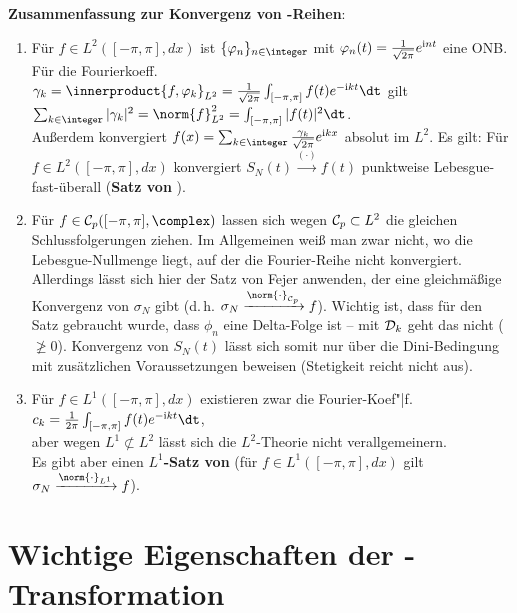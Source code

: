 \linie

\textbf{Zusammenfassung zur Konvergenz von -Reihen}:
\begin{enumerate}
    \item
    Für $f \in L^2([-\pi, \pi], dx)$ ist $\{\varphi_n\}_{n \in \integer}$
    mit $\varphi_n(t) = \frac{1}{\sqrt{2\pi}} e^{\mathrm{i} nt}$ eine ONB.
    Für die Fourierkoeff. $\gamma_k = \innerproduct{f, \varphi_k}_{L^2} =
    \frac{1}{\sqrt{2\pi}} \int_{[-\pi, \pi]} f(t) e^{-\i kt}\dt$ gilt
    $\sum_{k \in \integer} |\gamma_k|^2 = \norm{f}_{L^2}^2 =
    \int_{[-\pi, \pi]} |f(t)|^2 \dt$.\\
    Außerdem konvergiert $f(x) = \sum_{k \in \integer}
    \frac{\gamma_k}{\sqrt{2\pi}} e^{\i kx}$ absolut im $L^2$.
    Es gilt:
    Für $f \in L^2([-\pi, \pi], dx)$ konvergiert
    $S_N(t) \xrightarrow{(\cdot)} f(t)$ punktweise Lebesgue-fast-überall
    (\textbf{Satz von }).

    \item
    Für $f \in \C_p([-\pi, \pi], \complex)$ lassen sich wegen
    $\mathcal{C}_p \subset L^2$ die gleichen Schlussfolgerungen ziehen.
    Im Allgemeinen weiß man zwar nicht, wo die Lebesgue-Nullmenge liegt,
    auf der die Fourier-Reihe nicht konvergiert.
    Allerdings lässt sich hier der Satz von Fejer anwenden, der eine
    gleichmäßige Konvergenz von $\sigma_N$ gibt
    (d.\,h. $\sigma_N \xrightarrow{\norm{\cdot}_{\C_p}} f$).
    Wichtig ist, dass für den Satz gebraucht wurde, dass $\phi_n$ eine
    Delta-Folge ist -- mit $\mathcal{D}_k$ geht das nicht ($\not\ge 0$).
    Konvergenz von $S_N(t)$ lässt sich somit nur über die Dini-Bedingung mit
    zusätzlichen Voraussetzungen beweisen (Stetigkeit reicht nicht aus).

    \item
    Für $f \in L^1([-\pi, \pi], dx)$ existieren zwar die
    Fourier-Koef"|f.
    $c_k = \frac{1}{2\pi} \int_{[-\pi, \pi]} f(t) e^{-\i kt} \dt$,\\
    aber wegen $L^1 \not\subset L^2$ lässt sich die $L^2$-Theorie nicht
    verallgemeinern.\\
    Es gibt aber einen \textbf{$L^1$-Satz von }
    (für $f \in L^1([-\pi, \pi], dx)$ gilt
    $\sigma_N \xrightarrow{\norm{\cdot}_{L^1}} f$).
\end{enumerate}

\section{%
    Wichtige Eigenschaften der -Transformation%
}

